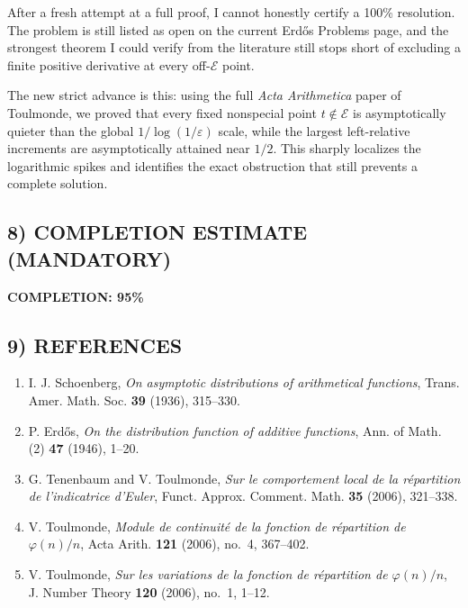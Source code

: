 After a fresh attempt at a full proof, I cannot honestly certify a 100\% resolution. The problem is still listed as open on the current Erd\H{o}s Problems page, and the strongest theorem I could verify from the literature still stops short of excluding a finite positive derivative at every off-$\mathcal E$ point.

The new strict advance is this: using the full \emph{Acta Arithmetica} paper of Toulmonde, we proved that every fixed nonspecial point $t\notin\mathcal E$ is asymptotically quieter than the global $1/\log(1/\varepsilon)$ scale, while the largest left-relative increments are asymptotically attained near $1/2$.
This sharply localizes the logarithmic spikes and identifies the exact obstruction that still prevents a complete solution.

\subsection{8) COMPLETION ESTIMATE (MANDATORY)}

\textbf{COMPLETION: 95\%}

\subsection{9) REFERENCES}

\begin{enumerate}
\item I. J. Schoenberg, \emph{On asymptotic distributions of arithmetical functions}, Trans. Amer. Math. Soc. \textbf{39} (1936), 315--330.
\item P. Erd\H{o}s, \emph{On the distribution function of additive functions}, Ann. of Math. (2) \textbf{47} (1946), 1--20.
\item G. Tenenbaum and V. Toulmonde, \emph{Sur le comportement local de la r\'epartition de l'indicatrice d'Euler}, Funct. Approx. Comment. Math. \textbf{35} (2006), 321--338.
\item V. Toulmonde, \emph{Module de continuit\'e de la fonction de r\'epartition de $\varphi(n)/n$}, Acta Arith. \textbf{121} (2006), no.~4, 367--402.
\item V. Toulmonde, \emph{Sur les variations de la fonction de r\'epartition de $\varphi(n)/n$}, J. Number Theory \textbf{120} (2006), no.~1, 1--12.
\end{enumerate}

